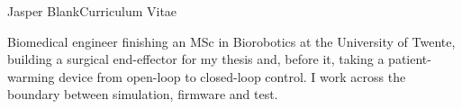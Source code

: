 \documentclass[10pt, a4paper]{awesome-cv}
\begin{document}
\makecvheader

\makecvfooter
  {}
  {Jasper Blank{\enskip\cdotp\enskip}Curriculum Vitae}
  {\thepage}


\begin{cvparagraph}
Biomedical engineer finishing an MSc in Biorobotics at the University of Twente, building a surgical
end-effector for my thesis and, before it, taking a patient-warming device from open-loop to
closed-loop control. I work across the boundary between simulation, firmware and test.
\end{cvparagraph}

\end{document}
